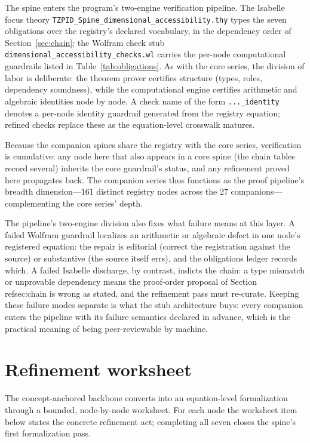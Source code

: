 \documentclass[11pt]{article}
\theoremstyle{remark}
\begin{document}
The spine enters the program's two-engine verification pipeline. The Isabelle focus theory \texttt{TZPID\_Spine\_dimensional\_accessibility.thy} types the seven obligations over the registry's declared vocabulary, in the dependency order of Section~\ref{sec:chain}; the Wolfram check stub \texttt{dimensional\_accessibility\_checks.wl} carries the per-node computational guardrails listed in Table~\ref{tab:obligations}. As with the core series, the division of labor is deliberate: the theorem prover certifies structure (types, roles, dependency soundness), while the computational engine certifies arithmetic and algebraic identities node by node. A check name of the form \texttt{...\_identity} denotes a per-node identity guardrail generated from the registry equation; refined checks replace these as the equation-level crosswalk matures.

Because the companion spines share the registry with the core series, verification is cumulative: any node here that also appears in a core spine (the chain tables record several) inherits the core guardrail's status, and any refinement proved here propagates back. The companion series thus functions as the proof pipeline's breadth dimension---161 distinct registry nodes across the 27 companions---complementing the core series' depth.

The pipeline's two-engine division also fixes what failure means at this layer. A failed Wolfram guardrail localizes an arithmetic or algebraic defect in one node's registered equation: the repair is editorial (correct the registration against the source) or substantive (the source itself errs), and the obligations ledger records which. A failed Isabelle discharge, by contrast, indicts the chain: a type mismatch or unprovable dependency means the proof-order proposal of Section~\\ref{sec:chain} is wrong as stated, and the refinement pass must re-curate. Keeping these failure modes separate is what the stub architecture buys: every companion enters the pipeline with its failure semantics declared in advance, which is the practical meaning of being peer-reviewable by machine.

\section{Refinement worksheet}
\label{sec:worksheet}

The concept-anchored backbone converts into an equation-level formalization through a bounded, node-by-node worksheet. For each node the worksheet item below states the concrete refinement act; completing all seven closes the spine's first formalization pass.
\end{document}
